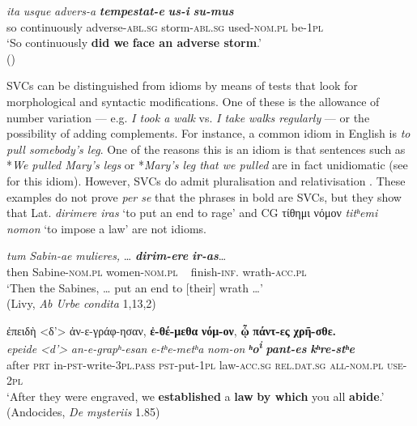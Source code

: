 \documentclass[output=paper,colorlinks,citecolor=brown]{langscibook}
\begin{document}
\ex\label{ex:ma:3b}

\gll \emph{ita} \emph{usque} \emph{advers-a} \textbf{\itshape tempestat-e}
\textbf{\itshape us-i} \textbf{\itshape su-mus}\\
so continuously adverse-\textsc{abl.sg} storm-\textsc{abl.sg} used-\textsc{nom.pl} be-\textsc{1pl}\\
\glt `So continuously \textbf{did we} \textbf{face an adverse storm}.' \\ 
\hspace*{\fill}()

\z

\z

SVCs can be distinguished from idioms by means of tests that look for morphological and
syntactic modifications. One of these is the allowance of number variation --- e.g.
  \textit{I took a walk} vs. \emph{I take walks regularly} --- or the possibility of adding
complements. For instance, a common idiom in English is \emph{to pull somebody's leg}. One
of the reasons this is an idiom is that sentences such as *\emph{We pulled Mary's legs} or
*\emph{Mary's leg that we pulled} are in fact unidiomatic (see \cite{melcuk_general_2023}
for this idiom). However, SVCs do admit pluralisation  and relativisation
. These examples do not prove \emph{per se} that the phrases in bold are
SVCs, but they show that Lat. \emph{dirimere iras} `to put an end to rage' and CG τίθημι
νόμον \emph{titʰemi nomon} `to impose a law' are not idioms.



\ea\label{ex:ma:4}

\ea\label{ex:ma:4a}

\gll \emph{tum} \emph{Sabin-ae} \emph{mulieres,} \ldots{} \textbf{\itshape dirim-ere} \textbf{\itshape ir-as}\ldots{}\\
then Sabine-\textsc{nom.pl} women-\textsc{nom.pl} ~ finish-\textsc{inf.} wrath-\textsc{acc.pl}\\
\glt `Then the Sabines, \ldots{} put an end to {[}their{]} wrath \ldots' \\
\hspace*{\fill}(Livy, \emph{Ab
  Urbe condita} 1,13,2)

\ex\label{ex:ma:4b}

\glll ἐπειδὴ <δ'> ἀν-ε-γράφ-ησαν, \textbf{ἐ-θέ-μεθα} \textbf{νόμ-ον}, \textbf{ᾧ} \textbf{πάντ-ες} \textbf{χρῆ-σθε.}\\
 \textit{epeide} \textit{<d'>} \textit{an-e-grapʰ-esan}
\textit{e-tʰe-metʰa} \textit{nom-on} \textit{\textbf{ʰo\textsuperscript{i}}} \textit{\textbf{pant-es}} \textit{\textbf{kʰre-stʰe}}\\
after \textsc{prt} in-\textsc{pst-}write-\textsc{3pl.pass} \textsc{pst-}put-\textsc{1pl}
law-\textsc{acc.sg} \textsc{rel.dat.sg} \textsc{all-nom.pl} \textsc{use-2pl}\\
\glt `After they were engraved, we \textbf{established} a \textbf{law} \textbf{by which} you all \textbf{abide}.' \\ 
\hspace*{\fill}(Andocides, \emph{De mysteriis} 1.85)
\end{document}
